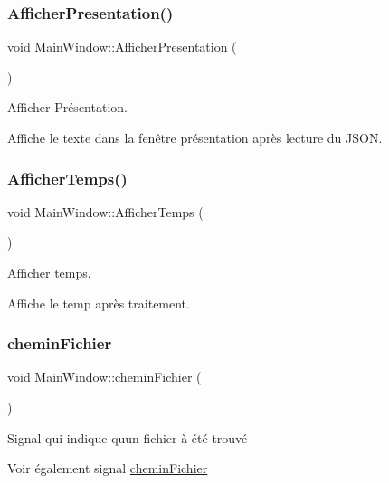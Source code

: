 \subsubsection{\texorpdfstring{Afficher\+Presentation()}{AfficherPresentation()}}
{\footnotesize\ttfamily void Main\+Window\+::\+Afficher\+Presentation (\begin{DoxyParamCaption}{ }\end{DoxyParamCaption})}



Afficher Présentation. 

Affiche le texte dans la fenêtre présentation après lecture du J\+S\+ON. \mbox{\label{class_main_window_a33811a52abf8f1ce71ec4e150d9c9ac8}} 
\subsubsection{\texorpdfstring{Afficher\+Temps()}{AfficherTemps()}}
{\footnotesize\ttfamily void Main\+Window\+::\+Afficher\+Temps (\begin{DoxyParamCaption}{ }\end{DoxyParamCaption})}



Afficher temps. 

Affiche le temp après traitement. \mbox{\label{class_main_window_a397116dafcb548fec351091cc025b822}} 
\subsubsection{\texorpdfstring{chemin\+Fichier}{cheminFichier}}
{\footnotesize\ttfamily void Main\+Window\+::chemin\+Fichier (\begin{DoxyParamCaption}\item[{Q\+String}]{ }\end{DoxyParamCaption})\hspace{0.3cm}{\ttfamily [signal]}}



Signal qui indique qu\textquotesingle{}un fichier à été trouvé 

\begin{DoxySeeAlso}{Voir également}
signal \hyperlink{class_main_window_a397116dafcb548fec351091cc025b822}{chemin\+Fichier} 
\end{DoxySeeAlso}

